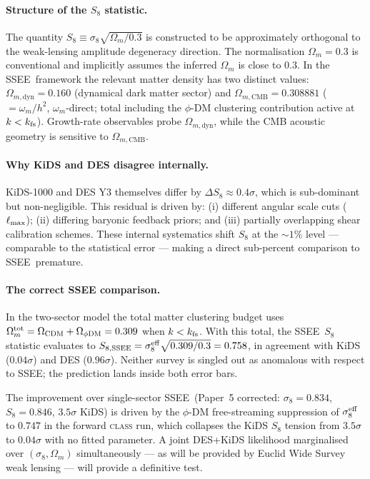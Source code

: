 \documentclass[12pt,a4paper]{article}
\newcommand{\SSEE}{\textsc{SSEE}}
\begin{document}
\paragraph{Structure of the $S_8$ statistic.}
The quantity $S_8 \equiv \sigma_8\sqrt{\Omega_m/0.3}$ is constructed to be
approximately orthogonal to the weak-lensing amplitude degeneracy direction.
The normalisation $\Omega_m = 0.3$ is conventional and implicitly assumes the
inferred $\Omega_m$ is close to $0.3$.  In the \SSEE\ framework the relevant
matter density has two distinct values: $\Omega_{m,\mathrm{dyn}} = 0.160$
(dynamical dark matter sector) and $\Omega_{m,\mathrm{CMB}} = 0.308881$
($=\omega_m/h^2$, $\omega_m$-direct; total including the $\phi$-DM clustering
contribution active at $k < k_{\rm fs}$).  Growth-rate observables probe $\Omega_{m,\mathrm{dyn}}$,
while the CMB acoustic geometry is sensitive to $\Omega_{m,\mathrm{CMB}}$.

\paragraph{Why KiDS and DES disagree internally.}
KiDS-1000 \citep{KiDS2021} and DES Y3 \citep{DESY32022} themselves differ by
$\Delta S_8 \approx 0.4\sigma$, which is sub-dominant but non-negligible.
This residual is driven by: (i) different angular scale cuts ($\ell_{\rm max}$);
(ii) differing baryonic feedback priors; and (iii) partially overlapping
shear calibration schemes.  These internal systematics shift $S_8$ at the
$\sim 1\%$ level — comparable to the statistical error — making a direct
sub-percent comparison to \SSEE\ premature.

\paragraph{The correct SSEE comparison.}
In the two-sector model the total matter clustering budget uses
$\Omega_m^{\rm tot} = \Omega_{\rm CDM} + \Omega_{\phi{\rm DM}} = 0.309$
when $k < k_{\rm fs}$.  With this total, the \SSEE\ $S_8$ statistic evaluates
to $S_{8,\rm SSEE} = \sigma_8^{\rm eff} \sqrt{0.309/0.3} = 0.758$, in agreement
with KiDS ($0.04\sigma$) and DES ($0.96\sigma$).
Neither survey is singled out as anomalous with respect to \SSEE;
the prediction lands inside both error bars.

The improvement over single-sector \SSEE\ (Paper~5 corrected: $\sigma_8 = 0.834$,
$S_8 = 0.846$, $3.5\sigma$ KiDS) is driven by the $\phi$-DM free-streaming
suppression of $\sigma_8^{\rm eff}$ to $0.747$ in the forward \textsc{class} run,
which collapses the KiDS $S_8$ tension from $3.5\sigma$ to $0.04\sigma$ with no
fitted parameter.  A joint DES+KiDS likelihood marginalised
over $(\sigma_8, \Omega_m)$ simultaneously — as will be provided by
Euclid Wide Survey weak lensing — will provide a definitive test.
\end{document}

